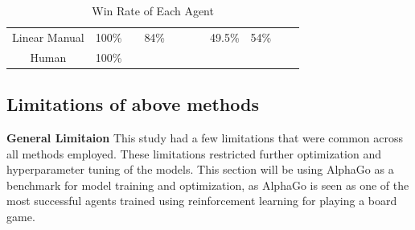 \documentclass[a4paper,12pt,table]{article}
\begin{document}
\begin{table}[H]
{\begin{tabular}{|c|cccccccccc}
    Linear Manual & \multicolumn{1}{c|}{100\%}                       & \multicolumn{1}{c|}{}                           & \multicolumn{1}{c|}{84\%}                       & \multicolumn{1}{c|}{}                           & \multicolumn{1}{c|}{}                           & \multicolumn{1}{c|}{}                           & \multicolumn{1}{c|}{49.5\%}                     & \multicolumn{1}{c|}{54\%}                        & \cellcolor[HTML]{000000}                        & \cellcolor[HTML]{000000}                        \\ \cline{1-10}
    Human          & \multicolumn{1}{c|}{100\%}                      & \multicolumn{1}{c|}{}                           & \multicolumn{1}{c|}{}                           & \multicolumn{1}{c|}{}                           & \multicolumn{1}{c|}{}                           & \multicolumn{1}{c|}{}                           & \multicolumn{1}{c|}{}                           & \multicolumn{1}{c|}{}                           & \multicolumn{1}{c|}{}                           & \cellcolor[HTML]{000000}                        \\ \cline{1-10}
    \end{tabular}%
    }
    \caption{Win Rate of Each Agent}
    \label{table:}
\end{table}


\subsection{Limitations of above methods}

\textbf{General Limitaion}
\newline
This study had a few limitations that were common across all methods employed. These limitations restricted further optimization and hyperparameter tuning of the models. This section will be using AlphaGo as a benchmark for model training and optimization, as AlphaGo is seen as one of the most successful agents trained using reinforcement learning for playing a board game. \par
\end{document}
